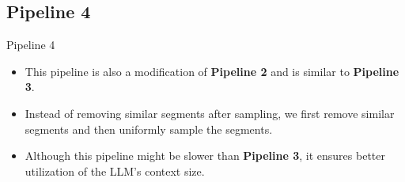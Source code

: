 \subsection{Pipeline 4}

\begin{frame}{Pipeline 4}

	\begin{itemize}
		\item This pipeline is also a modification of \textbf{Pipeline 2} and is similar to
		\textbf{Pipeline 3}.
		\item<2-> Instead of removing similar segments after sampling, we first remove similar
		segments and then uniformly sample the segments.
		\item<3-> Although this pipeline might be slower than \textbf{Pipeline 3}, it ensures
		better utilization of the LLM's context size.
	\end{itemize}
	
\end{frame}
